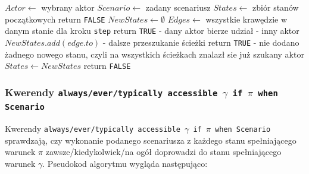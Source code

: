 \documentclass{article}
\begin{document}
\begin{algorithm}[H]
\begin{algorithmic}

\State $Actor \gets $ wybrany aktor
\State $Scenario \gets $ zadany scenariusz
\State $States \gets $ zbiór stanów początkowych
    \State return \texttt{FALSE}
\EndIf
{}
    \State $NewStates \gets \emptyset$
        \State $Edges \gets $ wszystkie krawędzie w danym stanie dla kroku \texttt{step}
        	        \State return \texttt{TRUE} - dany aktor bierze udział
        	    \EndIf
        	\Else - inny aktor
        	    \State $NewStates.add(edge.to)$ - dalsze przeszukanie ścieżki
            \EndIf
        \EndFor
    \EndFor
        \State return \texttt{TRUE} - nie dodano żadnego nowego stanu, czyli na wszystkich ścieżkach znalazł sie już szukany aktor
    \EndIf
    \State $States \gets NewStates$
\EndFor
\State return \texttt{FALSE}

\end{algorithmic}
\end{algorithm}
\newpage

\subsubsection{Kwerendy \texttt{always/ever/typically accessible $\gamma$ if $\pi$ when Scenario} }

Kwerendy \texttt{always/ever/typically accessible $\gamma$ if $\pi$ when Scenario} sprawdzają, czy wykonanie podanego scenariusza z każdego stanu spełniającego warunek $\pi$ zawsze/kiedykolwiek/na ogół doprowadzi do stanu spełniającego warunek $\gamma$. Pseudokod algorytmu wygląda następująco:\\
\end{document}
